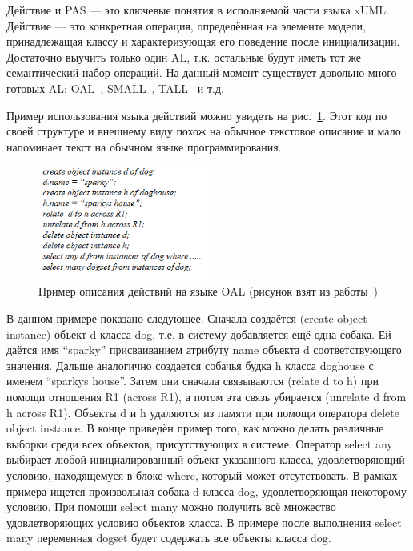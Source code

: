 \documentclass[a5paper]{article}
\begin{document}
Действие и PAS  — это ключевые понятия в исполняемой части языка xUML. Действие — это конкретная операция, определённая на элементе модели, принадлежащая классу и характеризующая его поведение после инициализации. Достаточно выучить только один AL, т.к. остальные будут иметь тот же семантический набор операций. На данный момент существует довольно много готовых AL: OAL~\cite{oal}, SMALL~\cite{al1}, TALL~\cite{xuml3} и т.д.

Пример использования языка действий можно увидеть на рис.~\ref{fig2}. Этот код по своей структуре и внешнему виду похож на обычное текстовое описание и мало напоминает текст на обычном языке программирования.

\begin{figure} [ht]
  \begin{center}
    \includegraphics[width=0.5\textwidth]{xuml-oal-syntax.png}
    \caption{Пример описания действий на языке OAL (рисунок взят из работы~\cite{xuml2})}
    \label{fig2}
  \end{center}
\end{figure}

В данном примере показано следующее. Сначала создаётся (create object instance) объект d класса dog, т.е. в систему добавляется ещё одна собака. Ей даётся имя “sparky” присваиванием атрибуту name объекта d соответствующего значения. Дальше аналогично создается собачья будка h класса doghouse с именем “sparkys house”. Затем они сначала связываются (relate d to h) при помощи отношения R1 (across R1), а потом эта связь убирается (unrelate d from h across R1). Объекты d и h удаляются из памяти при помощи оператора delete object instance. В конце приведён пример того, как можно делать различные выборки среди всех объектов, присутствующих в системе. Оператор select any выбирает любой инициалированный объект указанного класса, удовлетворяющий условию, находящемуся в блоке where, который может отсутствовать. В рамках примера ищется произвольная собака d класса dog, удовлетворяющая некоторому условию. При помощи select many можно получить всё множество удовлетворяющих условию объектов класса. В примере после 
выполнения select many переменная dogset будет содержать все объекты класса dog.
\end{document}
